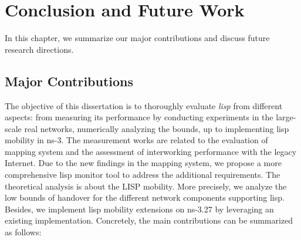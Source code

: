 
\chapter{Conclusion and Future Work}
\label{cha:conclusion}
In this chapter, we summarize our major contributions and discuss future research directions.

\section{Major Contributions}
The objective of this dissertation is to thoroughly evaluate \emph{\acrfull{lisp}} from different aspects: from measuring its performance by conducting experiments in the large-scale real networks, numerically analyzing the bounds, up to implementing \acrshort{lisp} mobility in ns-3. The measurement works are related to the evaluation of mapping system and the assessment of interworking performance with the legacy Internet. Due to the new findings in the mapping system, we propose a more comprehensive \acrshort{lisp} monitor tool to address the additional requirements. The theoretical analysis is about the LISP mobility. More precisely, we analyze the low bounds of handover for the different network components supporting \acrshort{lisp}. Besides, we implement \acrshort{lisp} mobility extensions on ns-3.27 by leveraging an existing implementation. Concretely, the main contributions can be summarized as follows:

